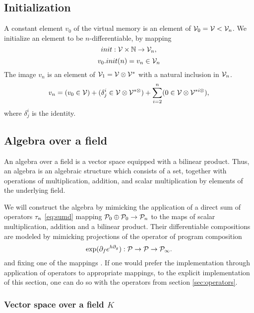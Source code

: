 \subsection{Initialization}

A constant element $v_0$ of the virtual memory is an element of $\mathcal{V}_0=\mathcal{V}<\mathcal{V}_n$. We initialize an element to be $n$-differentiable, by mapping
\begin{equation}
init:\mathcal{V}\times\mathbb{N}\to\mathcal{V}_n,
\end{equation}
\begin{equation}
v_0.init(n)=v_n\in\mathcal{V}_n
\end{equation}
The image $v_n$ is an element of $\mathcal{V}_1=\mathcal{V}\otimes\mathcal{V}^*$ with a natural inclusion in $\mathcal{V}_n$.
\begin{equation}
v_n=(v_0\in\mathcal{V})+(\delta^i_j\in\mathcal{V}\otimes\mathcal{V}^ {*\otimes})+\sum\limits_{i=2}^n(0\in\mathcal{V}\otimes\mathcal{V}^ {*i\otimes}),
\end{equation}
where $\delta^i_j$ is the identity.

\subsection{Algebra over a field}\label{sec:Algebra}

 An algebra over a field is a vector space equipped with a bilinear product. Thus, an algebra is an algebraic structure which consists of a set, together with operations of multiplication, addition, and scalar multiplication by elements of the underlying field. \cite[p.~3]{Algebra}
 
We will construct the algebra by mimicking the application of a direct sum of operators $\tau_n$ \eqref{eq:sumd} mapping $\mathcal{P}_0\oplus\mathcal{P}_0\to\mathcal{P}_n$ to the maps of scalar multiplication, addition and a bilinear product. 
Their differentiable compositions are modeled by mimicking projections of the operator of program composition \cite[Theorem~5.3]{OperationalCalculus}
 \begin{equation}\label{eq:kom}
   \exp(\partial_fe^{h\partial_g}): \mathcal{P}\to \mathcal{P}\to\mathcal{P}_\infty.
   \end{equation}
and fixing one of the mappings \cite[eq.~44,~45]{OperationalCalculus}. If one would prefer the implementation through application of operators to appropriate mappings, to the explicit implementation of this section, one can do so with the operators from section \ref{sec:operators}.

\subsubsection{Vector space over a field $K$}\label{sec:vectorSpace}
 
